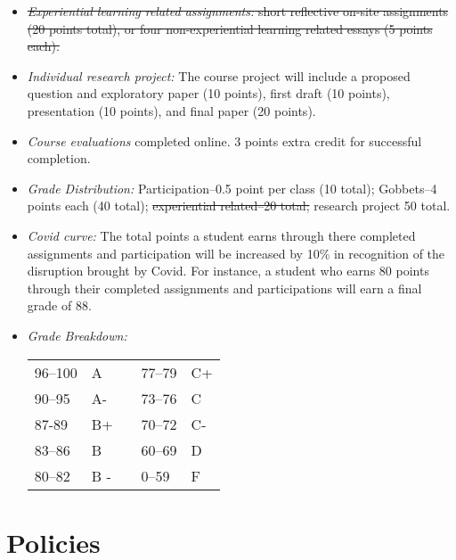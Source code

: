 \documentclass[article,oneside]{memoir}
\begin{document}
\begin{itemize}
\item \sout{\textit{Experiential learning related assignments:} short reflective on-site assignments (20 points total), or four non-experiential learning related essays (5 points each).}

\item \textit{Individual research project:} The course project will include a proposed question and exploratory paper (10 points), first draft (10 points), presentation (10 points), and final paper (20 points). 

\item \textit{Course evaluations} completed online. 3 points extra credit for successful completion.

\item \textit{Grade Distribution:} Participation--0.5 point per class (10 total); Gobbets--4 points each (40 total); \sout{experiential related--20 total;} research project 50 total.

\item \textit{Covid curve:} The total points a student earns through there completed assignments and participation will be increased by 10\% in recognition of the disruption brought by Covid. For instance, a student who earns 80 points through their completed assignments and participations will earn a final grade of 88. 

\item \textit{Grade Breakdown:}

 \begin{tabular}{ | l | l | p{2cm} | l | l | }
    \hline 
96--100 & A  & &  77--79 &  C+ \\  
90--95 & A- & &  73--76 & C \\
87-89 & B+ &  &  70--72 & C- \\ 
83--86 & B  & &  60--69 & D\\
80--82 & B - & & 0--59 & F\\ \hline
    \end{tabular}


\end{itemize}





\section{Policies}
\end{document}

